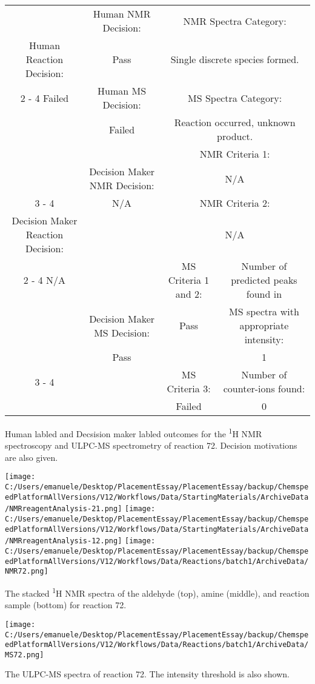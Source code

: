 \documentclass{article}%
\begin{document}
\begin{Decision Table}[H]%
\begin{tabular}{|c|c|c|c|}%
\hline%
&Human NMR Decision:&\multicolumn{2}{|c|}{NMR Spectra Category:}\\%
Human Reaction Decision:&Pass&\multicolumn{2}{|c|}{Single discrete species formed.}\\%
\cline{2%
-%
4}%
Failed&Human MS Decision:&\multicolumn{2}{|c|}{MS Spectra Category:}\\%
&Failed&\multicolumn{2}{|c|}{Reaction occurred, unknown product.}\\%
\hline%
&&\multicolumn{2}{|c|}{NMR Criteria 1:}\\%
&Decision Maker NMR Decision:&\multicolumn{2}{|c|}{N/A}\\%
\cline{3%
-%
4}%
&N/A&\multicolumn{2}{|c|}{NMR Criteria 2:}\\%
Decision Maker Reaction Decision:&&\multicolumn{2}{|c|}{N/A}\\%
\cline{2%
-%
4}%
N/A&&MS Criteria 1 and 2:&Number of predicted peaks found in\\%
&Decision Maker MS Decision:&Pass&MS spectra with appropriate intensity:\\%
&Pass&&1\\%
\cline{3%
-%
4}%
&&MS Criteria 3:&Number of counter{-}ions found:\\%
&&Failed&0\\%
\hline%
\end{tabular}%
\caption{Human labled and Decsision maker labled outcomes for the \textsuperscript{1}H NMR spectroscopy and ULPC-MS spectrometry of reaction 72. Decision motivations are also given.}%
\end{Decision Table}%
\begin{NMR Spectra}[H]%
\begin{center}%
\texttt{[image: C:/Users/emanuele/Desktop/PlacementEssay/PlacementEssay/backup/ChemspeedPlatformAllVersions/V12/Workflows/Data/StartingMaterials/ArchiveData/NMRreagentAnalysis-21.png]}\hfill%
\texttt{[image: C:/Users/emanuele/Desktop/PlacementEssay/PlacementEssay/backup/ChemspeedPlatformAllVersions/V12/Workflows/Data/StartingMaterials/ArchiveData/NMRreagentAnalysis-12.png]}\hfill%
\texttt{[image: C:/Users/emanuele/Desktop/PlacementEssay/PlacementEssay/backup/ChemspeedPlatformAllVersions/V12/Workflows/Data/Reactions/batch1/ArchiveData/NMR72.png]}\hfill%
\end{center}%
\caption{The stacked \textsuperscript{1}H NMR spectra of the aldehyde (top), amine (middle), and reaction sample (bottom) for reaction 72.}%
\end{NMR Spectra}%
\begin{MS Spectra}[H]%
\begin{center}%
\texttt{[image: C:/Users/emanuele/Desktop/PlacementEssay/PlacementEssay/backup/ChemspeedPlatformAllVersions/V12/Workflows/Data/Reactions/batch1/ArchiveData/MS72.png]}\hfill%
\end{center}%
\caption{The ULPC-MS spectra of reaction 72. The intensity threshold is also shown.}%
\end{MS Spectra}%
\end{document}
